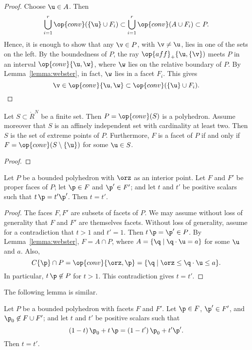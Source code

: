 \begin{proof}
Choose $\u\in A$.   Then
\[ 
\bigcup_{i=1}^r \op{conv}(\{\u\}\cup F_i) \subset \bigcup_{i=1}^r \op{conv}(A\cup F_i)\subset P.
\] 
Hence, it is enough to show that any $\v\in P$, with $\v\ne \u$, 
lies in one of the sets on the left.
By the boundedness of $P$, the ray $\op{aff}_+\{\u,\{\v\})$ meets $P$ in an interval
$\op{conv}\{\u,\w\}$, where $\w$ lies on the relative boundary of $P$.  By Lemma~\ref{lemma:webster}, in fact, $\w$ lies in a facet $F_i$.  This gives
\[ 
 \v\in \op{conv}\{\u,\w\}\subset \op{conv}(\{\u\}\cup F_i).
\] 
\end{proof}


\begin{lemma}[]\label{lemma:simplex-poly}
  Let $S\subset\ring{R}^N$ be a finite set.  Then $P=\op{conv}(S)$ is
  a polyhedron.  Assume moreover that $S$ is an affinely independent
  set with cardinality at least two.  Then $S$ is the set of extreme
  points of $P$. Furthermore,   $F$ is a facet of $P$ if and only if $F =
  \op{conv}(S\setminus \{\u\})$ for some $\u\in S$.
\end{lemma}

\begin{proof}
\end{proof}

\begin{lemma}[]\cutrate{} \label{lemma:scale} 
Let $P$ be a bounded polyhedron with $\orz$ as an interior point.
Let $F$ and $F'$ be proper faces of $P$; let $\p\in F$ and
$\p'\in F'$; and let  $t$ and $t'$ be  positive scalars such that $t\, \p = t' \p'$.
Then $t=t'$.
\end{lemma}

\begin{proof} The faces $F,F'$ are subsets of facets of $P$.  We may assume
without loss of generality that $F$ and $F'$ are themselves facets.  Without
loss of generality, assume for a contradiction that $t>1$ and $t'=1$.
Then $t\, \p = \p'\in P$.
By Lemma~\ref{lemma:webster}, $F = A \cap P$, where $A= \{\q
\mid \q\cdot \u = a\}$ for some $\u$ and $a$.  Also,
\[ 
C\{\p\}\cap P = \op{conv}\{\orz,\p\} = \{\q \mid \orz\le \q\cdot \u \le a\}.
\] 
In particular, $t\, \p\not\in P$ for $t>1$.  This contradiction gives
$t = t'$.
\end{proof}

The following lemma is similar.

\begin{lemma}[]\cutrate{} \label{lemma:scale2} 
Let $P$ be a bounded polyhedron with facets $F$ and $F'$.
Let $\p\in F$,
$\p'\in F'$, 
and $\p_0\not\in F\cup F'$; and let  $t$ and $t'$ be  positive scalars such that 
\[
(1-t)\, \p_0 + t\, \p = (1-t')\, \p_0 + t' \p'.
\]
Then $t=t'$.
\end{lemma}



